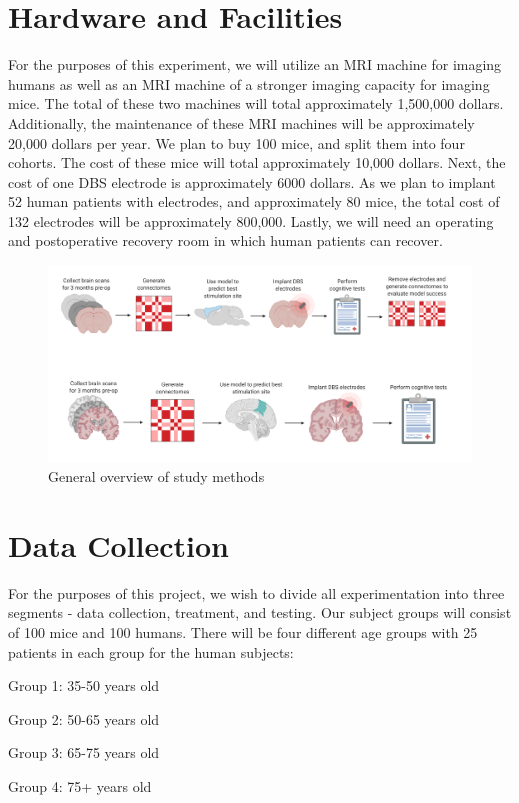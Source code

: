 \documentclass{article}
\begin{document}
\section{Hardware and Facilities}
For the purposes of this experiment, we will utilize an MRI machine for imaging humans as well as an MRI machine of a stronger imaging capacity for imaging mice. The total of these two machines will total approximately 1,500,000 dollars. Additionally, the maintenance of these MRI machines will be approximately 20,000 dollars per year. We plan to buy 100 mice, and split them into four cohorts. The cost of these mice will total approximately 10,000 dollars. Next, the cost of one DBS electrode is approximately 6000 dollars. As we plan to implant 52 human patients with electrodes, and approximately 80 mice, the total cost of 132 electrodes will be approximately 800,000. Lastly, we will need an operating and postoperative recovery room in which human patients can recover. 

\begin{figure}[h!]
\centering
\includegraphics[width=120mm, scale=0.5]{Connectomics.png}
\caption{General overview of study methods}
\label{fig:connectomics}
\end{figure}

\section{Data Collection}
For the purposes of this project, we wish to divide all experimentation into three segments - data collection, treatment, and testing. Our subject groups will consist of 100 mice and 100 humans. There will be four different age groups with 25 patients in each group for the human subjects:

Group 1: 35-50 years old

Group 2: 50-65 years old

Group 3: 65-75 years old

Group 4: 75+ years old
\end{document}
